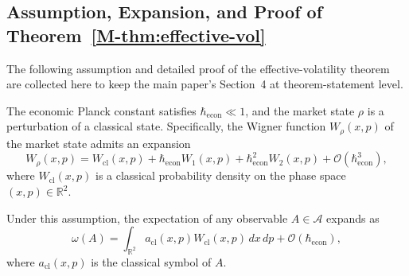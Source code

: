
\subsection{Assumption, Expansion, and Proof of Theorem~\ref{M-thm:effective-vol}}
\label{sec:S1-wkb}

The following assumption and detailed proof of the effective-volatility theorem
are collected here to keep the main paper's Section~4 at theorem-statement level.

\begin{assumption}
The economic Planck constant satisfies $\hbar_{\mathrm{econ}} \ll 1$, and the
market state $\rho$ is a perturbation of a classical state. Specifically, the
Wigner function $W_\rho(x, p)$ of the market state admits an expansion
\begin{equation}\label{eq:S.wigner-expansion}
    W_\rho(x, p) = W_{\mathrm{cl}}(x, p) + \hbar_{\mathrm{econ}} W_1(x, p)
    + \hbar_{\mathrm{econ}}^2 W_2(x, p) + \mathcal{O}(\hbar_{\mathrm{econ}}^3),
\end{equation}
where $W_{\mathrm{cl}}(x, p)$ is a classical probability density on the phase space
$(x, p) \in \mathbb{R}^2$.
\end{assumption}

Under this assumption, the expectation of any observable $A \in \mathcal{A}$ expands as
\begin{equation*}
    \omega(A) = \int_{\mathbb{R}^2} a_{\mathrm{cl}}(x, p) W_{\mathrm{cl}}(x, p)
    \, dx \, dp + \mathcal{O}(\hbar_{\mathrm{econ}}),
\end{equation*}
where $a_{\mathrm{cl}}(x, p)$ is the classical symbol of $A$.

